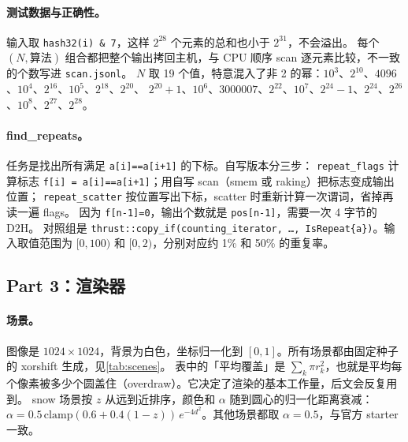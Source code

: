 \documentclass[11pt,a4paper]{ctexart}
\begin{document}
\paragraph{测试数据与正确性。} 输入取 \texttt{hash32(i) \& 7}，这样 $2^{28}$ 个元素的总和也小于 $2^{31}$，不会溢出。
每个 $(N,\text{算法})$ 组合都把整个输出拷回主机，与 CPU 顺序 scan 逐元素比较，不一致的个数写进 \texttt{scan.jsonl}。
$N$ 取 19 个值，特意混入了非 2 的幂：$10^3$、$2^{10}$、$4096$、$10^4$、$2^{16}$、$10^5$、$2^{18}$、$2^{20}$、
$2^{20}+1$、$10^6$、$3000007$、$2^{22}$、$10^7$、$2^{24}-1$、$2^{24}$、$2^{26}$、$10^8$、$2^{27}$、$2^{28}$。

\paragraph{find\_repeats。} 任务是找出所有满足 \texttt{a[i]==a[i+1]} 的下标。自写版本分三步：
\texttt{repeat\_flags} 计算标志 \texttt{f[i] = a[i]==a[i+1]}；用自写 scan（smem 或 raking）把标志变成输出位置；
\texttt{repeat\_scatter} 按位置写出下标，scatter 时重新计算一次谓词，省掉再读一遍 flags。
因为 \texttt{f[n-1]=0}，输出个数就是 \texttt{pos[n-1]}，需要一次 4 字节的 D2H。
对照组是 \texttt{thrust::copy\_if(counting\_iterator, \dots, IsRepeat\{a\})}。输入取值范围为 $[0,100)$ 和 $[0,2)$，分别对应约 1\% 和 50\% 的重复率。

\subsection{Part 3：渲染器}

\paragraph{场景。} 图像是 $1024\times1024$，背景为白色，坐标归一化到 $[0,1]$。所有场景都由固定种子的 xorshift 生成，见\cref{tab:scenes}。
表中的「平均覆盖」是 $\sum_k \pi r_k^2$，也就是平均每个像素被多少个圆盖住（overdraw）。它决定了渲染的基本工作量，后文会反复用到。
snow 场景按 $z$ 从远到近排序，颜色和 $\alpha$ 随到圆心的归一化距离衰减：
$\alpha = 0.5\,\mathrm{clamp}(0.6+0.4(1-z))\,e^{-4d^2}$。其他场景都取 $\alpha=0.5$，与官方 starter 一致。
\end{document}
